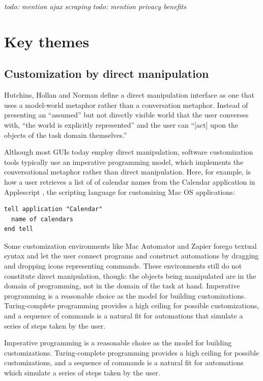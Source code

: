 \documentclass[sigplan,screen,10pt,anonymous,review]{acmart}
\begin{document}
\emph{todo: mention ajax scraping} \emph{todo: mention privacy benefits}

\hypertarget{sec:themes}{%
\section{Key themes}\label{sec:themes}}

\hypertarget{sec:dm}{%
\subsection{Customization by direct manipulation}\label{sec:dm}}

Hutchins, Hollan and Norman \citep{hutchins1985} define a direct
manipulation interface as one that uses a model-world metaphor rather
than a conversation metaphor. Instead of presenting an ``assumed'' but
not directly visible world that the user converses with, ``the world is
explicitly represented'' and the user can ``{[}act{]} upon the objects
of the task domain themselves.''

Although most GUIs today employ direct manipulation, software
customization tools typically use an imperative programming model, which
implements the conversational metaphor rather than direct manipulation.
Here, for example, is how a user retrieves a list of of calendar names
from the Calendar application in Applescript \citep{cook2007}, the
scripting language for customizing Mac OS applications:

\begin{verbatim}
tell application "Calendar"
  name of calendars
end tell
\end{verbatim}

Some customization environments like Mac Automator and Zapier forego
textual syntax and let the user connect programs and construct
automations by dragging and dropping icons representing commands. These
environments still do not constitute direct manipulation, though: the
objects being manipulated are in the domain of programming, not in the
domain of the task at hand. Imperative programming is a reasonable
choice as the model for building customizations. Turing-complete
programming provides a high ceiling for possible customizations, and a
sequence of commands is a natural fit for automations that simulate a
series of steps taken by the user.

Imperative programming is a reasonable choice as the model for building
customizations. Turing-complete programming provides a high ceiling for
possible customizations, and a sequence of commands is a natural fit for
automations which simulate a series of steps taken by the user.
\end{document}
